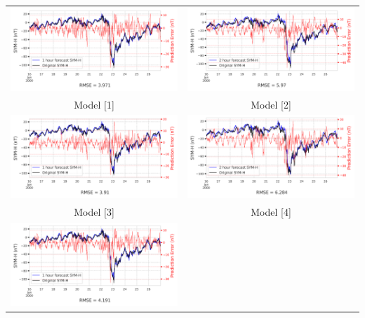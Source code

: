\documentclass[draft,sw]{agutexSI2019}
\begin{document}
\begin{table}
\centering
\begin{tabular}{cc}
\includegraphics[width=0.49\linewidth]{paper_plots/1h_swics/1h_swics_storm_30.png}
&
\includegraphics[width=0.49\linewidth]{paper_plots/2h_swics/2h_swics_storm_30.png}
\\
Model [1] & Model [2]
\vspace*{12pt}
\\
\includegraphics[width=0.49\linewidth]{paper_plots/1h_no_swics/1h_no_swics_storm_30.png}
&
\includegraphics[width=0.49\linewidth]{paper_plots/2h_no_swics/2h_no_swics_storm_30.png}
\\
Model [3] & Model [4]
\vspace*{12pt}
\\
\includegraphics[width=0.49\linewidth]{paper_plots/1h_swics_model_on_no_swics/1h_swics_model_on_no_swics_storm_30.png}

\end{tabular}
\end{table}
\end{document}
